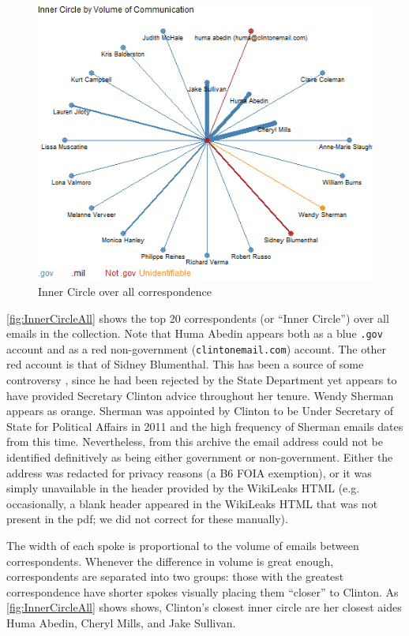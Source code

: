 \documentclass[journal]{vgtc}                %
\begin{document}
\begin{figure}[h]
\begin{center}
\includegraphics[width=0.95\linewidth]{SpiralNetworkFullTime}
\caption{Inner Circle over all correspondence}
\label{fig:InnerCircleAll}
\end{center}
\end{figure}
\autoref{fig:InnerCircleAll} shows the top 20 correspondents (or ``Inner Circle'')  over all emails in the collection.
Note that Huma Abedin appears both as a blue  \texttt{.gov} account and as a red non-government (\texttt{clintonemail.com}) account.   The other red account is that of Sidney Blumenthal.  This has been a source of some controversy  \cite{BlumenthalControversy, NYTBlumenthalBenghazi}, since he had been rejected by the State Department yet appears to have provided Secretary Clinton advice throughout her tenure.  Wendy Sherman appears as orange. Sherman was appointed by Clinton to be Under Secretary of State for Political Affairs in 2011 and the high frequency of Sherman emails dates from this time.  Nevertheless, from this archive the email address could not be identified definitively as being either government or non-government.  Either the address was redacted for privacy reasons (a B6 FOIA exemption), or it was simply unavailable in the header provided by the WikiLeaks HTML \cite{WikileaksPull} (e.g. occasionally, a blank header appeared in the WikiLeaks HTML that was not present in the pdf; we did not correct for these manually).

The width of each spoke is proportional to the volume of emails between correspondents.  Whenever the difference in volume is great enough,  correspondents are separated into two groups: those with the greatest correspondence have shorter spokes visually placing them ``closer'' to Clinton.  As \autoref{fig:InnerCircleAll} shows shows, Clinton's closest inner circle are her closest aides Huma Abedin, Cheryl Mills, and Jake Sullivan.
\end{document}
